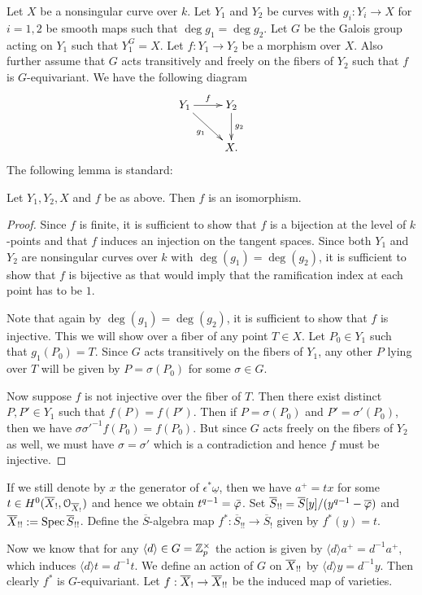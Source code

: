\documentclass{amsart}
\newcommand{\uomega}{\underline{\omega}}
\newcommand{\barS}{\overline{S}}
\numberwithin{equation}{section}
\DeclareMathOperator{\Spec}{\mathrm{Spec}}
\newcommand{\obar}[1]{\overline{#1}}
\begin{document}
Let $X$ be a nonsingular curve over $k$.
Let $Y_1$ and $Y_2$ be  curves with $g_i: Y_i \rightarrow X$ for $i=1,2$ 
be smooth maps such that $\deg g_1 = \deg g_2$. Let $G$ be the 
Galois 
group acting on $Y_1$ such that $Y_1^G = X$. Let $f:Y_1 \rightarrow Y_2$ be a morphism
over $X$. Also further assume that $G$ acts transitively and freely 
on the fibers of $Y_2$ such that $f$ is $G$-equivariant. We have the 
following diagram
$$\xymatrix{
Y_1 \ar[dr]_{g_1} \ar[r]^f & Y_2 \ar[d]^{g_2} \\
& X.
}$$
The following lemma is standard:
\begin{lemma}
\label{gg}
Let $Y_1, Y_2, X$ and $f$ be as above. Then $f$ is an isomorphism.
\end{lemma}
\begin{proof}
Since $f$ is finite, it is sufficient to show that $f$ is a bijection at 
the level of $k$-points and that $f$ induces an injection on the tangent spaces.
Since both $Y_1$ and $Y_2$ are nonsingular curves over $k$ with 
$\deg (g_1) = \deg (g_2)$, it is sufficient to show that $f$ is bijective as
that would imply that the ramification index at each point has to be $1$.

Note that again by $\deg (g_1) = \deg (g_2)$, it is sufficient to show that
$f$ is injective. This we will show
over a fiber of any point $T \in X$. Let $P_0 \in Y_1$ such that 
$g_1(P_0)= T$.
Since $G$ acts transitively on the fibers of $Y_1$, any other $P$ lying over
$T$ will be given by $P= \sigma(P_0)$ for some $\sigma \in G$.

Now suppose $f$ is not injective over the fiber of $T$. Then there exist
distinct $P, P' \in Y_1$ such that $f(P)=f(P')$. Then if $P=\sigma (P_0)$ and
$P'=\sigma'(P_0)$, then we have $\sigma \sigma'^{-1} f(P_0) = f(P_0)$. But
since $G$ acts freely on the fibers of $Y_2$ as well, we must have 
$\sigma = \sigma'$ which is a contradiction and hence $f$ must be injective.
\end{proof}

If we still denote by $x$ the generator of $\epsilon^*\uomega$, then 
we have $a^+ = t x$ for some $t \in H^0(\overline{X}_! ,\mathcal{O}_{\overline{X}_!})$ and 
hence we obtain $t^{q-1} = \bar{\varphi}$. 
Set $\overline{S}_{!!}= \barS[y]/(y^{q-1}- \obar{\vp})$
and $\Xpp:=\Spec \overline{S}_{!!}$. Define the $\overline{S}$-algebra
map $f^*:\overline{S}_{!!} \rightarrow \overline{S}_!$ given by $f^*(y)=t$.

Now we know that for any $\langle d \rangle \in G=\mathbb{Z}_p^{\times}$ the action
is given by
$\langle d \rangle a^+ = d^{-1} a^+$, which induces $\langle d\rangle t
= d^{-1} t$. We define an action of $G$ on $\overline{X}_{!!} $ by 
$\langle d \rangle y = d^{-1}y$. Then clearly $f^*$ is $G$-equivariant.
Let $f:\overline{X}_! \rightarrow \overline{X}_{!!}$ be the induced map of varieties.
\end{document}
